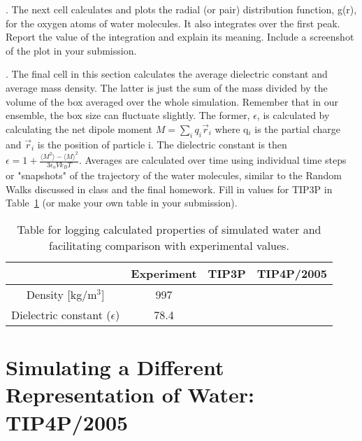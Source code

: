 \documentclass{article}
\begin{document}
\vspace*{1cm}
. The next cell calculates and plots the radial (or pair) distribution function, g(r), for the oxygen atoms of water molecules. It also integrates over the first peak. Report the value of the integration and explain its meaning. Include a screenshot of the plot in your submission.

\vspace*{1cm}
. The final cell in this section calculates the average dielectric constant and average mass density. The latter is just the sum of the mass divided by the volume of the box averaged over the whole simulation. Remember that in our ensemble, the box size can fluctuate slightly. The former, $\epsilon$, is calculated by calculating the net dipole moment $M = \sum_i q_i \vec{r}_i$ where q$_i$ is the partial charge and $\vec{r}_i$ is the position of particle i. The dielectric constant is then $\epsilon = 1 + \frac{\langle M^2 \rangle - \langle M \rangle^2}{3 \epsilon_o V k_B T}$. Averages are calculated over time using individual time steps or "snapshots" of the trajectory of the water molecules, similar to the Random Walks discussed in class and the final homework. Fill in values for TIP3P in Table~\ref{tab:water-properties} (or make your own table in your submission). 

\begin{table}[H]
    \centering
    \begin{tabular}{c c c c}
        \hline
          & Experiment & TIP3P & TIP4P/2005 \\
         \hline
        Density [kg/m$^3$] & 997 & & \\
        Dielectric constant ($\epsilon$) & 78.4 & & \\
        \hline
    \end{tabular}
    \caption{Table for logging calculated properties of simulated water and facilitating comparison with experimental values.}
    \label{tab:water-properties}
\end{table}

\section{Simulating a Different Representation of Water: TIP4P/2005}
\end{document}
